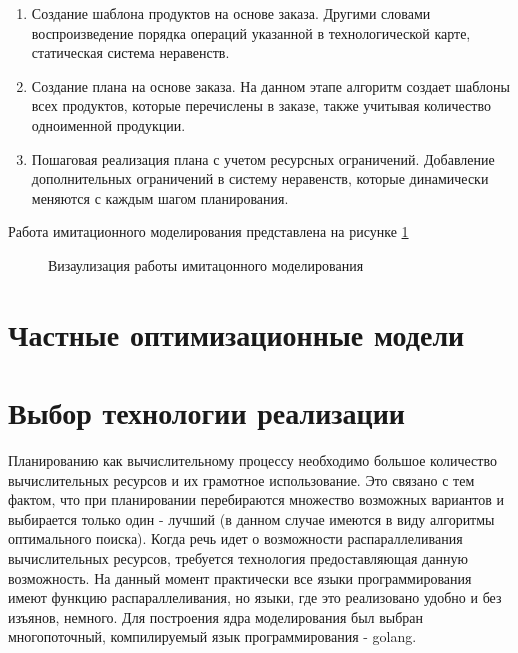 \begin{enumerate}
    \item Создание шаблона продуктов на основе заказа. Другими словами воспроизведение порядка операций указанной в технологической карте, статическая система неравенств.
    \item Создание плана на основе заказа. На данном этапе алгоритм создает шаблоны всех продуктов, которые перечислены в заказе, также учитывая количество одноименной продукции.
    \item Пошаговая реализация плана с учетом ресурсных ограничений. Добавление дополнительных ограничений в систему неравенств, которые динамически меняются с каждым шагом планирования.
\end{enumerate}
Работа имитационного моделирования представлена на рисунке \ref{ris:alg}
\begin{figure}[H]
    \caption{Визаулизация работы имитацонного моделирования}
    \label{ris:alg}
\end{figure}

\section{Частные оптимизационные модели}

\section{Выбор технологии реализации}

Планированию как вычислительному процессу необходимо большое количество вычислительных ресурсов и их грамотное использование. Это связано с тем фактом, что при планировании перебираются множество возможных вариантов и выбирается только один - лучший (в данном случае имеются в виду алгоритмы оптимального поиска). Когда речь идет о возможности распараллеливания вычислительных ресурсов, требуется технология предоставляющая данную возможность. На данный момент практически все языки программирования имеют функцию распараллеливания, но языки, где это реализовано удобно и без изъянов, немного.  Для построения ядра моделирования был выбран многопоточный, компилируемый язык программирования - golang.

